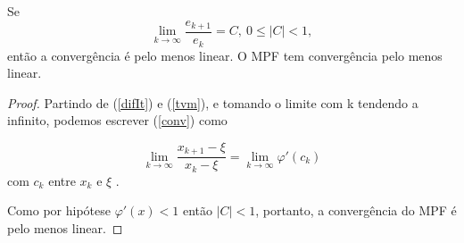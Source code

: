 \begin{prop}
    Se 
    \begin{equation}\label{conv}
        \lim_{k \to \infty} \frac{e_{k+1}}{e_k} = C, \ 0 \leq |C| < 1,
    \end{equation}
    então a convergência é pelo menos linear. O MPF tem convergência pelo menos linear.
\end{prop}
\begin{proof}
Partindo de (\ref{difIt}) e (\ref{tvm}), e tomando o  limite com k tendendo a infinito, podemos escrever (\ref{conv}) como

\begin{equation*} %
    \lim_{k \to \infty} \frac{x_{k+1} - \xi}{x_k - \xi} = \lim_{k \to \infty}\varphi'(c_k)
\end{equation*} %
com $c_k$ entre $x_k$ e $\xi$
. %

Como por hipótese $\varphi'(x) < 1$ então $|C| < 1$, portanto, a convergência do MPF é pelo menos linear.
\end{proof}
    
